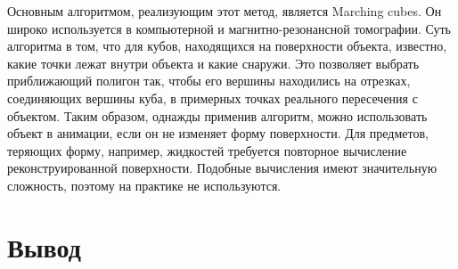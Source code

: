 Основным алгоритмом, реализующим этот метод, является Marching cubes.
Он широко используется в компьютерной и магнитно-резонансной томографии.
Суть алгоритма в том, что для кубов, находящихся на поверхности объекта, известно,
какие точки лежат внутри объекта и какие снаружи. Это позволяет выбрать
приближающий полигон так, чтобы его вершины находились на отрезках, соединяющих вершины куба,
в примерных точках реального пересечения с объектом.
Таким образом, однажды применив алгоритм, можно использовать объект в анимации, если
он не изменяет форму поверхности.
Для предметов, теряющих форму, например, жидкостей требуется повторное вычисление
реконструированной поверхности. Подобные вычисления имеют значительную сложность,
поэтому на практике не используются.


\section{Вывод}


